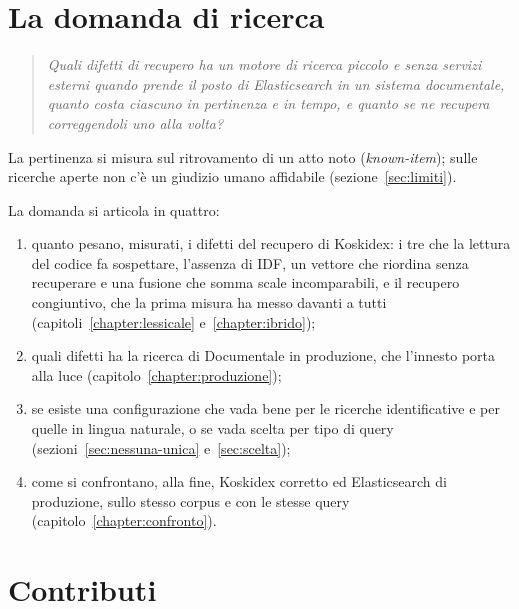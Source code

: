 \section{La domanda di ricerca}\label{sec:domanda}

\begin{quote}
  \emph{Quali difetti di recupero ha un motore di ricerca piccolo e senza
  servizi esterni quando prende il posto di Elasticsearch in un sistema documentale,
  quanto costa ciascuno in pertinenza e in tempo, e quanto se ne recupera
  correggendoli uno alla volta?}
\end{quote}

La pertinenza si misura sul ritrovamento di un atto noto (\emph{known-item}); sulle
ricerche aperte non c'è un giudizio umano affidabile (sezione~\ref{sec:limiti}).

La domanda si articola in quattro:
\begin{enumerate}
  \item quanto pesano, misurati, i difetti del recupero di Koskidex: i tre che la
        lettura del codice fa sospettare, l'assenza di IDF, un vettore che
        riordina senza recuperare e una fusione che somma scale incomparabili, e
        il recupero congiuntivo, che la prima misura ha messo davanti a tutti (capitoli~\ref{chapter:lessicale} e~\ref{chapter:ibrido});
  \item quali difetti ha la ricerca di Documentale in produzione, che l'innesto
        porta alla luce (capitolo~\ref{chapter:produzione});
  \item se esiste una configurazione che vada bene per le ricerche identificative
        e per quelle in lingua naturale, o se vada scelta per tipo di query
        (sezioni~\ref{sec:nessuna-unica} e~\ref{sec:scelta});
  \item come si confrontano, alla fine, Koskidex corretto ed Elasticsearch di
        produzione, sullo stesso corpus e con le stesse query
        (capitolo~\ref{chapter:confronto}).
\end{enumerate}

\section{Contributi}\label{sec:contributi}

